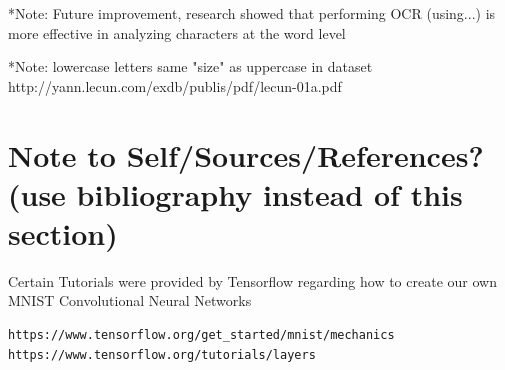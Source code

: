 \documentclass[11pt]{article}
\begin{document}
*Note: Future improvement, research showed that performing OCR (using...) is more effective in analyzing characters at the word level

*Note: lowercase letters same "size" as uppercase in dataset
http://yann.lecun.com/exdb/publis/pdf/lecun-01a.pdf



\section{Note to Self/Sources/References?(use bibliography instead of this section)}
Certain Tutorials were provided by Tensorflow regarding how to create our own MNIST Convolutional Neural Networks
\begin{verbatim}
https://www.tensorflow.org/get_started/mnist/mechanics
https://www.tensorflow.org/tutorials/layers
\end{verbatim}

\clearpage


\end{document}
